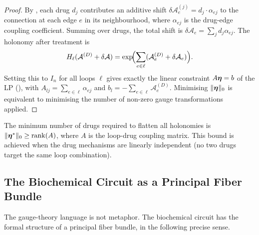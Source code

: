 \begin{proof}
By , each drug $d_j$ contributes an additive
shift $\delta\mathcal{A}_e^{(j)} = d_j \cdot \alpha_{ej}$ to the connection at
each edge $e$ in its neighbourhood, where $\alpha_{ej}$ is the drug-edge coupling
coefficient.  Summing over drugs, the total shift is
$\delta\mathcal{A}_e = \sum_j d_j \alpha_{ej}$.  The holonomy after treatment is
\[
  H_\ell(\mathcal{A}^{(D)} + \delta\mathcal{A})
  = \exp\!\Bigl(\sum_{e \in \ell} (\mathcal{A}^{(D)}_e + \delta\mathcal{A}_e)\Bigr).
\]
Setting this to $I_n$ for all loops $\ell$ gives exactly the linear constraint
$A\boldsymbol{\eta} = b$ of the LP (), with
$A_{lj} = \sum_{e \in \ell} \alpha_{ej}$ and $b_l = -\sum_{e \in \ell}
\mathcal{A}^{(D)}_e$.  Minimising $\|\boldsymbol{\eta}\|_0$ is equivalent to minimising
the number of non-zero gauge transformations applied.
\end{proof}

\begin{corollary}
\label{cor:ch11-rank-bound}
The minimum number of drugs required to flatten all holonomies is
$\|\boldsymbol{\eta}^*\|_0 \geq \mathrm{rank}(A)$, where $A$ is the loop-drug coupling
matrix.  This bound is achieved when the drug mechanisms are linearly independent
(no two drugs target the same loop combination).
\end{corollary}

\subsection{The Biochemical Circuit as a Principal Fiber Bundle}
\label{subsec:ch11-fiber-bundle}

The gauge-theory language is not metaphor.  The biochemical circuit has
the formal structure of a principal fiber bundle, in the following precise sense.

